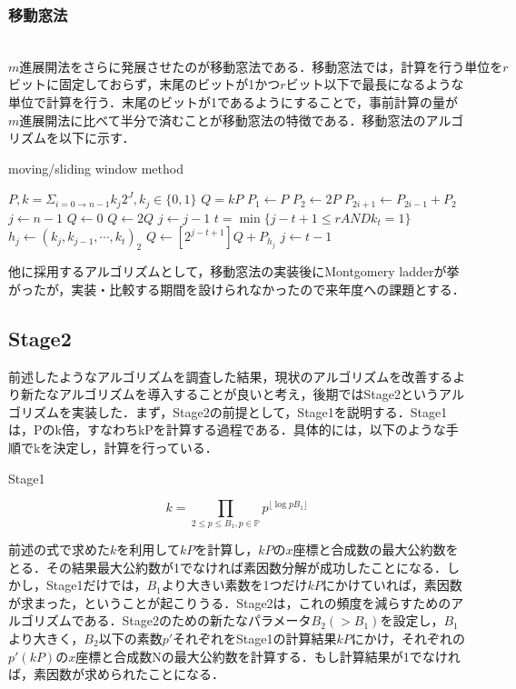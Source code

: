 \documentclass[openany,11pt,papersize]{jsbook}
\begin{document}

\subsubsection{移動窓法}
　$m進展開法をさらに発展させたのが移動窓法である．移動窓法では，計算を行う単位をr$ビットに固定しておらず，末尾のビットが1かつ$r$ビット以下で最長になるような単位で計算を行う．末尾のビットが1であるようにすることで，事前計算の量が$m$進展開法に比べて半分で済むことが移動窓法の特徴である．移動窓法のアルゴリズムを以下に示す．
　
\begin{algorithm}[H]                   
\caption{moving/sliding window method}
\label{alg:algW}                          
\begin{algorithmic}                  
\REQUIRE $P, k=\Sigma_{i=0 \rightarrow n-1}k_j 2^J,k_j \in \{0,1\}$
\ENSURE $Q=kP$
\STATE $P_1 \leftarrow P$
\STATE $P_2 \leftarrow 2P$
\STATE $P_{2i+1} \leftarrow P_{2i-1}+P_2$
\ENDFOR
\STATE $j \leftarrow n-1$
\STATE $Q \leftarrow 0$
\STATE $Q \leftarrow 2Q$
\STATE $j \leftarrow j-1$
\ELSE
\STATE $t= \min \{ j-t+1 \leq r AND k_t = 1 \}$
\STATE $h_j \leftarrow ( k_j, k_{j-1},  \cdots , k_t)_2$
\STATE $Q \leftarrow [2^{j-t+1}]Q + P_{h_j}$
\STATE $j \leftarrow t-1$
\ENDIF
\ENDWHILE
\end{algorithmic}
\end{algorithm}

他に採用するアルゴリズムとして，移動窓法の実装後にMontgomery ladderが挙がったが，実装・比較する期間を設けられなかったので来年度への課題とする．

\subsection{Stage2}
前述したようなアルゴリズムを調査した結果，現状のアルゴリズムを改善するより新たなアルゴリズムを導入することが良いと考え，後期ではStage2というアルゴリズムを実装した．まず，Stage2の前提として，Stage1を説明する．Stage1は，Pのk倍，すなわちkPを計算する過程である．具体的には，以下のような手順でkを決定し，計算を行っている．

\begin{itembox}[l]{Stage1}
\begin{center}
\[
k = \prod_{2 \leq p \leq B_1, p \in \mathbb{P}} p^{\lfloor \log{p} B_1 \rfloor}
\]
\end{center}
\end{itembox}

前述の式で求めた$k$を利用して$kP$を計算し，$kP$の$x$座標と合成数の最大公約数をとる．その結果最大公約数が1でなければ素因数分解が成功したことになる．しかし，Stage1だけでは，$B_1$より大きい素数を1つだけ$kP$にかけていれば，素因数が求まった，ということが起こりうる．Stage2は，これの頻度を減らすためのアルゴリズムである．Stage2のための新たなパラメータ$B_2(> B_1)$を設定し，$B_1$より大きく，$B_2$以下の素数$p'$それぞれをStage1の計算結果$kP$にかけ，それぞれの$p'(kP)$の$x$座標と合成数Nの最大公約数を計算する．もし計算結果が1でなければ，素因数が求められたことになる．
\end{document}
